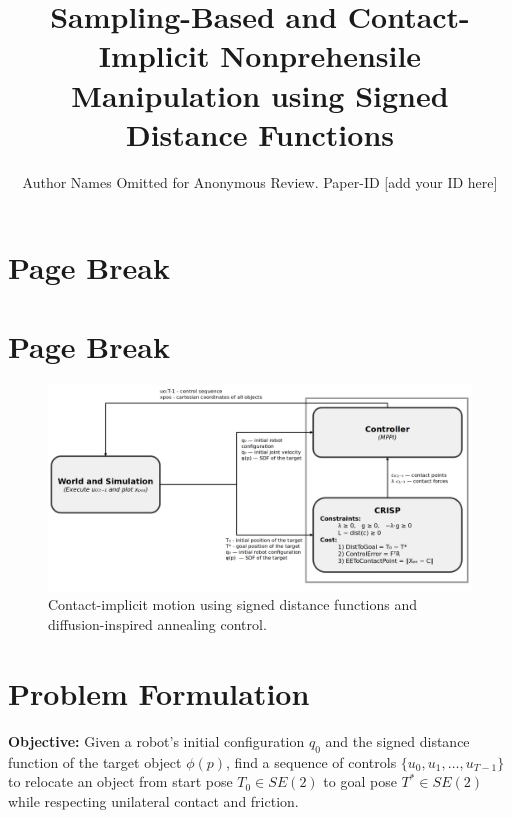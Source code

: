\documentclass[conference]{IEEEtran}
\begin{document}
\title{Sampling-Based and Contact-Implicit Nonprehensile \\ Manipulation using Signed Distance Functions}

\author{Author Names Omitted for Anonymous Review. Paper-ID [add your ID here]}

\author{
}

\maketitle
\IEEEpeerreviewmaketitle

\newpage
\section{Page Break}
\newpage
\section{Page Break}
\newpage

\begin{figure}[!t]
  \centering
  \includegraphics[width=\textwidth]{Figs/Chart.png}
  \caption{Contact-implicit motion using signed distance functions and diffusion-inspired annealing control.}
  \label{fig:contact-implicit-motion}
\end{figure}

\section{Problem Formulation}
\noindent\textbf{Objective:} Given a robot's initial configuration $q_0$ and the signed distance function of the target object $\phi(p)$, find a sequence of controls $\{u_0, u_1, \dots, u_{T-1}\}$ to relocate an object from start pose $T_0\!\in\!SE(2)$ to goal pose $T^*\!\in\!SE(2)$ while respecting unilateral contact and friction.
\medskip
\end{document}
